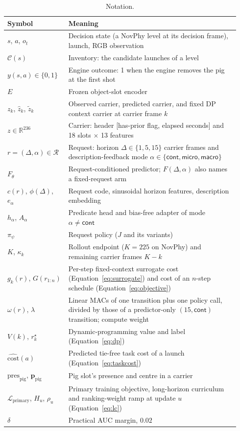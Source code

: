\begin{table}[H]
\ifshowrevisions\color{blue}\fi
\centering
\footnotesize
\caption{Notation.}
\label{tab:app:notation}
\begin{tabular}{@{}>{\raggedright\arraybackslash}p{0.24\linewidth}>{\raggedright\arraybackslash}p{0.7\linewidth}@{}}
\toprule
Symbol & Meaning \\
\midrule
$s$, $a$, $o_t$ & Decision state (a NovPhy level at its decision frame), launch, RGB observation \\
$\mathcal{C}(s)$ & Inventory: the candidate launches of a level \\
$y(s,a)\in\{0,1\}$ & Engine outcome: 1 when the engine removes the pig at the first shot \\
$E$ & Frozen object-slot encoder \\
$z_k$, $\hat z_k$, $\tilde z_k$ & Observed carrier, predicted carrier, and fixed DP context carrier at carrier frame $k$ \\
$z\in\mathbb{R}^{236}$ & Carrier: header [has-prior flag, elapsed seconds] and 18 slots $\times$ 13 features \\
$r=(\Delta,\alpha)\in\mathcal{R}$ & Request: horizon $\Delta\in\{1,5,15\}$ carrier frames and description-feedback mode $\alpha\in\{\textsf{cont},\textsf{micro},\textsf{macro}\}$ \\
$F_\theta$ & Request-conditioned predictor; $F(\Delta,\alpha)$ also names a fixed-request arm \\
$c(r)$, $\phi(\Delta)$, $e_\alpha$ & Request code, sinusoidal horizon features, description embedding \\
$h_\alpha$, $A_\alpha$ & Predicate head and bias-free adapter of mode $\alpha\neq\textsf{cont}$ \\
$\pi_\psi$ & Request policy ($J$ and its variants) \\
$K$, $\kappa_k$ & Rollout endpoint ($K=225$ on NovPhy) and remaining carrier frames $K-k$ \\
$g_k(r)$, $G(r_{1:n})$ & Per-step fixed-context surrogate cost (Equation~\ref{eq:surrogate}) and cost of an $n$-step schedule (Equation~\ref{eq:objective}) \\
$\omega(r)$, $\lambda$ & Linear MACs of one transition plus one policy call, divided by those of a predictor-only $(15,\textsf{cont})$ transition; compute weight \\
$V(k)$, $r^\star_k$ & Dynamic-programming value and label (Equation~\ref{eq:dp}) \\
$\widehat{\mathrm{cost}}(a)$ & Predicted tie-free task cost of a launch (Equation~\ref{eq:taskcost}) \\
$\mathrm{pres}_{\mathrm{pig}}$, $\mathbf{p}_{\mathrm{pig}}$ & Pig slot's presence and centre in a carrier \\
$\mathcal{L}_{\mathrm{primary}}$, $H_u$, $\rho_u$ & Primary training objective, long-horizon curriculum and ranking-weight ramp at update $u$ (Equation~\ref{eq:lc}) \\
$\delta$ & Practical AUC margin, $0.02$ \\
\bottomrule
\end{tabular}
\end{table}

